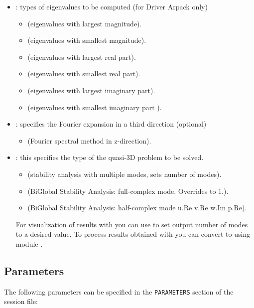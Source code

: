 \begin{itemize}
\item {}: types of eigenvalues to be computed (for Driver Arpack only)
\begin{itemize}
    \item {} (eigenvalues with largest magnitude).
    \item {} (eigenvalues with smallest magnitude).
    \item {} (eigenvalues with largest real part).
    \item {} (eigenvalues with smallest real part).
    \item {} (eigenvalues with largest imaginary part).
    \item {} (eigenvalues with smallest imaginary part ).
\end{itemize}

\item {}: specifies the Fourier expansion in a third direction (optional)
\begin{itemize}
    \item {} (Fourier spectral method in z-direction).
    \end{itemize}
    \item {}: this specifies the type of the quasi-3D problem to be solved.
\begin{itemize}
\item {} (stability analysis with multiple modes,  sets number of modes).
\item {} (BiGlobal Stability Analysis: full-complex mode. Overrides  to 1.).
\item {} (BiGlobal Stability Analysis: half-complex mode u.Re v.Re w.Im p.Re).
\end{itemize}
\begin{notebox}
  For visualization of  results with  you can use  to set output number of modes to a desired value.
  To process results obtained with  you can convert to  using  module .
\end{notebox}
\end{itemize}


\subsection{Parameters}
The following parameters can be specified in the \texttt{PARAMETERS} section of the session file:

